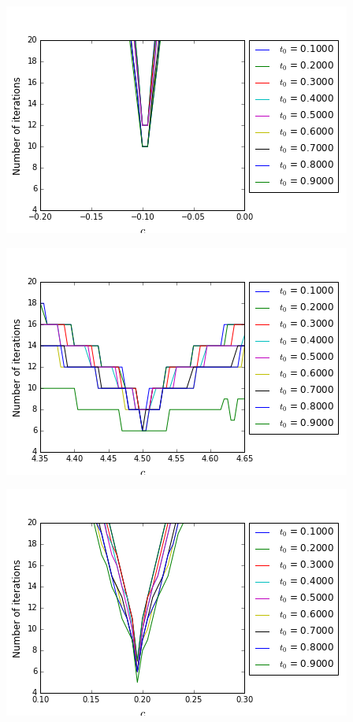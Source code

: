 \hfill
\begin{minipage}{.45\linewidth}
	\includegraphics[scale=.4]{figures/FinalFigures/NiterxCoefVarInterfaceFinalVersionNDetail2.png}
\end{minipage}
\begin{minipage}{.45\linewidth}
	\includegraphics[scale=.4]{figures/FinalFigures/NiterxCoefVarInterfaceFinalVersionPDetail.png}
\end{minipage}
\hfill
\begin{minipage}{.45\linewidth}
	\includegraphics[scale=.4]{figures/FinalFigures/NiterxCoefVarInterfaceFinalVersionPDetail2.png}
\end{minipage}
